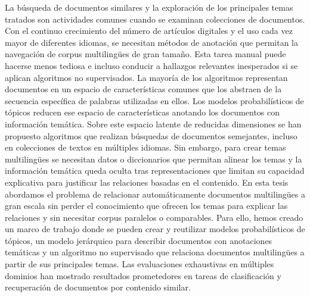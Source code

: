 \cleardoublepage
\begin{abstractslongSpanish}
La búsqueda de documentos similares y la exploración de los principales temas tratados son actividades comunes cuando se examinan colecciones de documentos. Con el continuo crecimiento del número de artículos digitales y el uso cada vez mayor de diferentes idiomas, se necesitan métodos de anotación que permitan la navegación de corpus multilingües de gran tamaño. Esta tarea manual puede hacerse menos tediosa e incluso conducir a hallazgos relevantes inesperados si se aplican algoritmos no supervisados. La mayoría de los algoritmos representan documentos en un espacio de características comunes que los abstraen de la secuencia específica de palabras utilizadas en ellos. Los modelos probabilísticos de tópicos reducen ese espacio de características anotando los documentos con información temática. Sobre este espacio latente de reducidas dimensiones se han propuesto algoritmos que realizan búsquedas de documentos semejantes, incluso en colecciones de textos en múltiples idiomas. Sin embargo, para crear temas multilingües se necesitan datos o diccionarios que permitan alinear los temas y la información temática queda oculta tras representaciones que limitan su capacidad explicativa para justificar las relaciones basadas en el contenido. En esta tesis abordamos el problema de relacionar automáticamente documentos multilingües a gran escala sin perder el conocimiento que ofrecen los temas para explicar las relaciones y sin necesitar corpus paralelos o comparables. Para ello, hemos creado un marco de trabajo donde se pueden crear y reutilizar modelos probabilísticos de tópicos, un modelo jerárquico para describir documentos con anotaciones temáticas y un algoritmo no supervisado que relaciona documentos multilingües a partir de sus principales temas. Las evaluaciones exhaustivas en múltiples dominios han mostrado resultados prometedores en tareas de clasificación y recuperación de documentos por contenido similar. 

\end{abstractslongSpanish}
